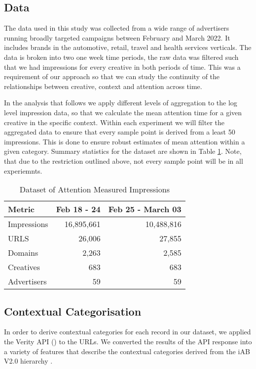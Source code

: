\documentclass[sigconf]{acmart}
\begin{document}
\subsection{Data}
The data used in this study was collected from a wide range of advertisers running
broadly targeted campaigns between February and March 2022. It includes brands in
the automotive, retail, travel and health services verticals.
The data is broken into two one week time periods, the raw data was filtered
such that we had impressions for every creative in both
periods of time. This was a requirement of our approach so that we can
study the continuity of the relationships between creative, context and attention
across time.

In the analysis that follows we apply different levels of aggregation to the
log level impression data, so that we calculate the mean attention time for
a given creative in the specific context. Within each experiment we will
filter the aggregated data to ensure that every sample point is derived from
a least 50 impressions. This is done to ensure robust estimates of mean attention within
a given category.
Summary statistics for the dataset are shown in Table \ref{tab:dataset}. Note, that
due to the restriction outlined above, not every sample point will be in all experiemnts.

\begin{table}
\caption{Dataset of Attention Measured Impressions}
\label{tab:dataset}
\begin{tabular}{|l|r|r|}
\toprule
Metric          &Feb 18 - 24    &Feb 25 - March 03          \\
\midrule
Impressions     &16,895,661     &10,488,816     \\
URLS            &26,006         &27,855         \\
Domains         &2,263          &2,585          \\
Creatives       &683            &683            \\
Advertisers     &59             &59             \\
\bottomrule
\end{tabular}
\end{table}

\subsection{Contextual Categorisation}

In order to derive contextual categories for each record in our dataset,
we applied the Verity API (\citeauthor{verity}) to the URLs. We converted the results of
the API response into a variety of features that describe the contextual
categories derived from the iAB V2.0 hierarchy \cite{iabv2}.
\end{document}
